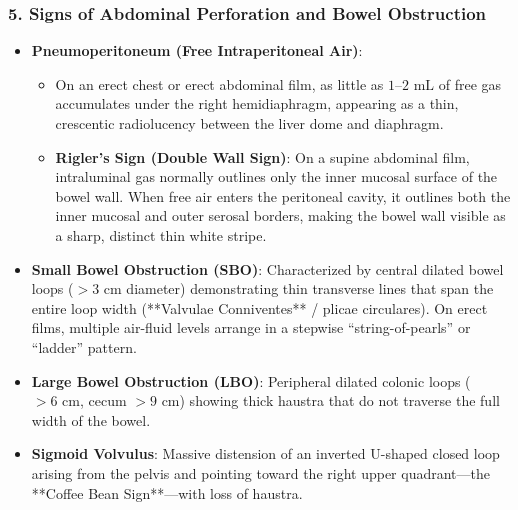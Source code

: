 \documentclass[11pt,a4paper]{article}
\begin{document}
\subsubsection{5. Signs of Abdominal Perforation and Bowel Obstruction}
\begin{itemize}[leftmargin=*]
    \item \textbf{Pneumoperitoneum (Free Intraperitoneal Air)}:
    \begin{itemize}
        \item On an erect chest or erect abdominal film, as little as $1\text{--}2\text{ mL}$ of free gas accumulates under the right hemidiaphragm, appearing as a thin, crescentic radiolucency between the liver dome and diaphragm.
        \item \textbf{Rigler's Sign (Double Wall Sign)}: On a supine abdominal film, intraluminal gas normally outlines only the inner mucosal surface of the bowel wall. When free air enters the peritoneal cavity, it outlines both the inner mucosal and outer serosal borders, making the bowel wall visible as a sharp, distinct thin white stripe.
    \end{itemize}
    \item \textbf{Small Bowel Obstruction (SBO)}: Characterized by central dilated bowel loops ($>3\text{ cm}$ diameter) demonstrating thin transverse lines that span the entire loop width (**Valvulae Conniventes** / plicae circulares). On erect films, multiple air-fluid levels arrange in a stepwise ``string-of-pearls'' or ``ladder'' pattern.
    \item \textbf{Large Bowel Obstruction (LBO)}: Peripheral dilated colonic loops ($>6\text{ cm}$, cecum $>9\text{ cm}$) showing thick haustra that do not traverse the full width of the bowel.
    \item \textbf{Sigmoid Volvulus}: Massive distension of an inverted U-shaped closed loop arising from the pelvis and pointing toward the right upper quadrant—the **Coffee Bean Sign**—with loss of haustra.
\end{itemize}
\end{document}
